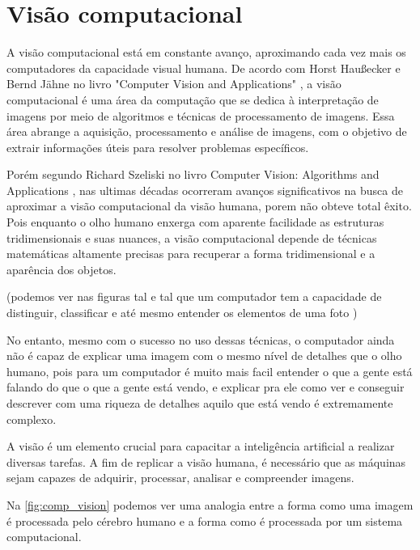 \section{Visão computacional}
A visão computacional está em constante avanço, aproximando cada vez mais os computadores da capacidade visual humana. De acordo com Horst Haußecker e Bernd Jähne no livro "Computer Vision and Applications" \cite{comp_vision_and_applications}, a visão computacional é uma área da computação que se dedica à interpretação de imagens por meio de algoritmos e técnicas de processamento de imagens. Essa área abrange a aquisição, processamento e análise de imagens, com o objetivo de extrair informações úteis para resolver problemas específicos.

Porém segundo Richard Szeliski no livro Computer Vision: Algorithms and Applications \cite{computer_vision_richard}, nas ultimas décadas ocorreram avanços significativos na busca de aproximar a visão computacional da visão humana, porem não obteve total êxito. Pois enquanto o olho humano enxerga com aparente facilidade as estruturas tridimensionais e suas nuances, a visão computacional depende de técnicas matemáticas altamente precisas para recuperar a forma tridimensional e a aparência dos objetos.

(podemos ver nas figuras tal e tal que um computador tem a capacidade de distinguir, classificar e até mesmo entender os elementos de uma foto )

No entanto, mesmo com o sucesso no uso dessas técnicas, o computador ainda não é capaz de explicar uma imagem com o mesmo nível de detalhes que o olho humano, pois para um computador é muito mais facil entender o que a gente está falando do que o que a gente está vendo, e explicar pra ele como ver e conseguir descrever com uma riqueza de detalhes aquilo que está vendo é extremamente  complexo.

A visão é um elemento crucial para capacitar a inteligência artificial a realizar diversas tarefas. A fim de replicar a visão humana, é necessário que as máquinas sejam capazes de adquirir, processar, analisar e compreender imagens. \cite{como_funciona_visao_computacional}

Na \cref{fig:comp_vision} podemos ver uma analogia entre a forma como uma imagem é processada pelo cérebro humano e a forma como é processada por um sistema computacional.

